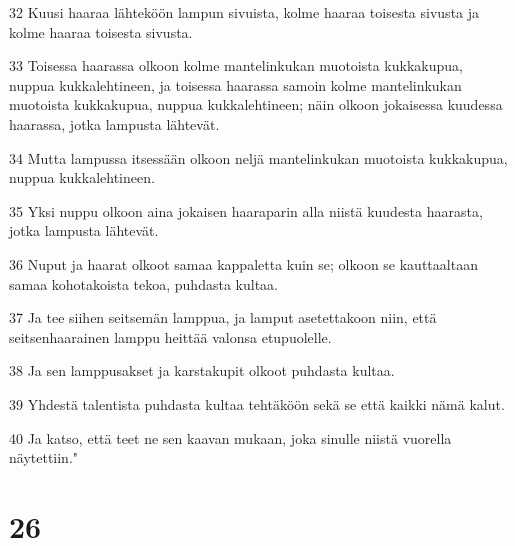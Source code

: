 \par 32 Kuusi haaraa lähteköön lampun sivuista, kolme haaraa toisesta sivusta ja kolme haaraa toisesta sivusta.
\par 33 Toisessa haarassa olkoon kolme mantelinkukan muotoista kukkakupua, nuppua kukkalehtineen, ja toisessa haarassa samoin kolme mantelinkukan muotoista kukkakupua, nuppua kukkalehtineen; näin olkoon jokaisessa kuudessa haarassa, jotka lampusta lähtevät.
\par 34 Mutta lampussa itsessään olkoon neljä mantelinkukan muotoista kukkakupua, nuppua kukkalehtineen.
\par 35 Yksi nuppu olkoon aina jokaisen haaraparin alla niistä kuudesta haarasta, jotka lampusta lähtevät.
\par 36 Nuput ja haarat olkoot samaa kappaletta kuin se; olkoon se kauttaaltaan samaa kohotakoista tekoa, puhdasta kultaa.
\par 37 Ja tee siihen seitsemän lamppua, ja lamput asetettakoon niin, että seitsenhaarainen lamppu heittää valonsa etupuolelle.
\par 38 Ja sen lamppusakset ja karstakupit olkoot puhdasta kultaa.
\par 39 Yhdestä talentista puhdasta kultaa tehtäköön sekä se että kaikki nämä kalut.
\par 40 Ja katso, että teet ne sen kaavan mukaan, joka sinulle niistä vuorella näytettiin."

\chapter{26}


